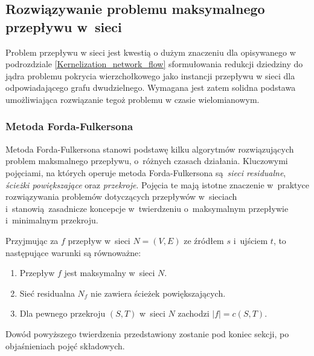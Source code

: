\subsection{Rozwiązywanie problemu maksymalnego przepływu w~sieci}\label{ss_max_flow}
\par{
  Problem przepływu w sieci jest kwestią o dużym znaczeniu dla opisywanego w podrozdziale \ref{Kernelization_network_flow} sformułowania redukcji dziedziny do jądra problemu pokrycia wierzchołkowego jako instancji przepływu w sieci dla odpowiadającego grafu dwudzielnego. 
  Wymagana jest zatem solidna podstawa umożliwiająca rozwiązanie tegoż problemu w czasie wielomianowym.
}
\subsubsection{\textbf{Metoda Forda-Fulkersona}}
\par{
  Metoda Forda-Fulkersona stanowi podstawę kilku algorytmów rozwiązujących problem maksmalnego przepływu, o~różnych czasach działania.
  Kluczowymi pojęciami, na których operuje metoda Forda-Fulkersona są \emph{sieci residualne}, \emph{ścieżki powiększające} oraz \emph{przekroje}.
  Pojęcia te mają istotne znaczenie w~praktyce rozwiązywania problemów dotyczących przepływów w~sieciach i~stanowią zasadnicze koncepcje w~twierdzeniu o~maksymalnym przepływie i~minimalnym przekroju.
  \begin{theorem}
    Przyjmując za $f$ przepływ w~sieci $N=(V,E)$ ze źródłem $s$ i~ujściem $t$, to następujące warunki są równoważne:
    \begin{enumerate}
      \item Przepływ $f$ jest maksymalny w~sieci $N$.
      \item Sieć residualna $N_f$ nie zawiera ścieżek powiększających.
      \item Dla pewnego przekroju $(S, T)$ w~sieci $N$ zachodzi $|f|=c(S,T)$.
    \end{enumerate}
  \end{theorem}
  Dowód powyższego twierdzenia przedstawiony zostanie pod koniec sekcji, po objaśnieniach pojęć składowych.
}
